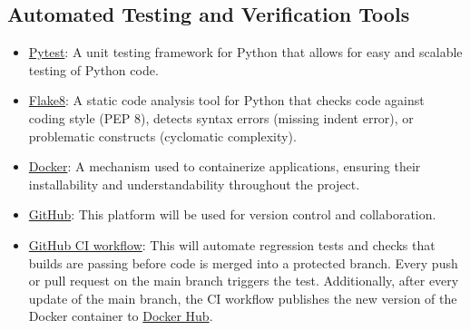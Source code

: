 \documentclass[12pt, titlepage]{article}
\begin{document}


\subsection{Automated Testing and Verification Tools}

\begin{itemize}
  \item \href{https://docs.pytest.org/}{Pytest}: A unit testing framework for Python that allows 
        for easy and scalable testing of Python code.
  \item \href{https://flake8.pycqa.org/}{Flake8}: A static code analysis tool for 
        Python that checks code against coding style (PEP 8), detects syntax errors (missing indent error), 
        or problematic constructs (cyclomatic complexity).
  \item \href{https://www.docker.com/}{Docker}: A mechanism used to containerize applications, 
        ensuring their installability and understandability throughout the project.
  \item \href{https://github.com/}{GitHub}: This platform will be used for 
        version control and collaboration.
  \item \href{https://docs.github.com/en/actions}{GitHub CI workflow}: This will 
        automate regression tests and checks that \progname{} builds are passing before 
        code is merged into a protected branch. Every push or pull request on the 
        main branch triggers the test. Additionally, after every update of 
        the main branch, the CI workflow publishes the new version of 
        the Docker container to \href{https://hub.docker.com/}{Docker Hub}.

\end{itemize}


\end{document}
